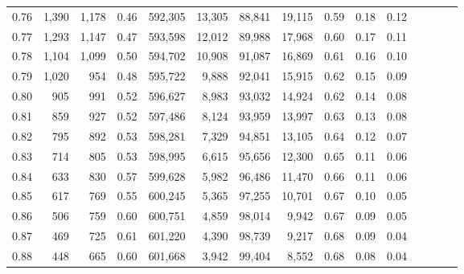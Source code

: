 \begin{tabular}{rrrcrrrrrrrrrrr}
0.76 &   1,390 &  1,178 &                                       0.46 &  592,305 &   13,305 &   88,841 &   19,115 &  0.59 &  0.18 &                         0.12 \\
0.77 &   1,293 &  1,147 &                                       0.47 &  593,598 &   12,012 &   89,988 &   17,968 &  0.60 &  0.17 &                         0.11 \\
0.78 &   1,104 &  1,099 &                                       0.50 &  594,702 &   10,908 &   91,087 &   16,869 &  0.61 &  0.16 &                         0.10 \\
0.79 &   1,020 &    954 &                                       0.48 &  595,722 &    9,888 &   92,041 &   15,915 &  0.62 &  0.15 &                         0.09 \\
0.80 &     905 &    991 &                                       0.52 &  596,627 &    8,983 &   93,032 &   14,924 &  0.62 &  0.14 &                         0.08 \\
0.81 &     859 &    927 &                                       0.52 &  597,486 &    8,124 &   93,959 &   13,997 &  0.63 &  0.13 &                         0.08 \\
0.82 &     795 &    892 &                                       0.53 &  598,281 &    7,329 &   94,851 &   13,105 &  0.64 &  0.12 &                         0.07 \\
0.83 &     714 &    805 &                                       0.53 &  598,995 &    6,615 &   95,656 &   12,300 &  0.65 &  0.11 &                         0.06 \\
0.84 &     633 &    830 &                                       0.57 &  599,628 &    5,982 &   96,486 &   11,470 &  0.66 &  0.11 &                         0.06 \\
0.85 &     617 &    769 &                                       0.55 &  600,245 &    5,365 &   97,255 &   10,701 &  0.67 &  0.10 &                         0.05 \\
0.86 &     506 &    759 &                                       0.60 &  600,751 &    4,859 &   98,014 &    9,942 &  0.67 &  0.09 &                         0.05 \\
0.87 &     469 &    725 &                                       0.61 &  601,220 &    4,390 &   98,739 &    9,217 &  0.68 &  0.09 &                         0.04 \\
0.88 &     448 &    665 &                                       0.60 &  601,668 &    3,942 &   99,404 &    8,552 &  0.68 &  0.08 &                         0.04 \\

\end{tabular}

